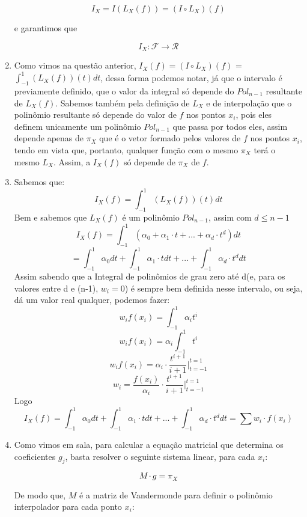 \documentclass[12pt]{article}
\begin{document}
\begin{enumerate}[1.]
     $$I_X = I(L_X(f)) =  (I \circ L_X) (f)$$  
     
     e garantimos que
     
     $$I_X:\mathcal{F} \rightarrow \mathcal{R} $$
     
    
    \bigskip\bigskip
    \item Como vimos na questão anterior, $I_X(f) = (I \circ L_X)(f)$ = $\int_{-1}^{1}(L_X(f))(t)dt$, dessa forma podemos notar, já que o intervalo é previamente definido, que o valor da integral só depende do $Pol_{n-1}$ resultante de $L_X(f)$. Sabemos também pela definição de $L_X$ e de interpolação que o polinômio resultante só depende do valor de $f$ nos pontos $x_i$, pois eles definem unicamente um polinômio $Pol_{n-1}$ que passa por todos eles, assim depende apenas de $\pi_X$ que é o vetor formado pelos valores de $f$ nos pontos $x_i$, tendo em vista que, portanto, qualquer função com o mesmo $\pi_X$ terá o mesmo $L_X$. Assim, a $I_X(f)$ só depende de $\pi_X$ de $f$.
    
    
    \bigskip\bigskip
    \item Sabemos que:
    $$I_X(f) = \int_{-1}^{1}(L_X(f))(t)dt $$
    Bem e sabemos que $L_X(f)$ é um polinômio $Pol_{n-1}$, assim com $d \leq n-1$
    $$I_X(f) = \int_{-1}^{1}( \alpha_0 + \alpha_1 \cdot t + ... + \alpha_{d} \cdot t^{d} )dt $$
    $$= \int_{-1}^{1} \alpha_0 dt + \int_{-1}^{1} \alpha_1 \cdot t dt + ... + \int_{-1}^{1} \alpha_{d} \cdot t^{d} dt$$
    Assim sabendo que a Integral de polinômios de grau zero até d(e, para os valores entre d e (n-1), $w_i =0$) é sempre bem definida nesse intervalo, ou seja, dá um valor real qualquer, podemos fazer:
    \[ w_i f(x_i) = \int_{-1}^{1} \alpha_i t^i \]
    \[ w_i f(x_i) = \alpha_i \int_{-1}^{1}  t^i \]
    \[ w_i f(x_i) = \alpha_i \cdot \frac{t^{i+1}}{i+1} \bigg|_{t=-1}^{t=1} \]
    \[ w_i  =  \frac{f(x_i) }{\alpha_i} \cdot \frac{t^{i+1}}{i+1} \bigg|_{t=-1}^{t=1} \]
    Logo
    \[I_X(f) =  \int_{-1}^{1} \alpha_0 dt + \int_{-1}^{1} \alpha_1 \cdot t dt + ... + \int_{-1}^{1} \alpha_{d} \cdot t^{d} dt = \sum w_i \cdot f(x_i)\]
    
    
    \bigskip\bigskip
    \item Como vimos em sala, para calcular a equação matricial que determina os coeficientes $g_j$, basta resolver o seguinte sistema linear, para cada $x_i$:
    
    $$ M \cdot g = \pi _X $$
    
    De modo que, $M$ é a matriz de Vandermonde para definir o polinômio interpolador para cada ponto $x_i$:
    

\end{enumerate}
\end{document}
